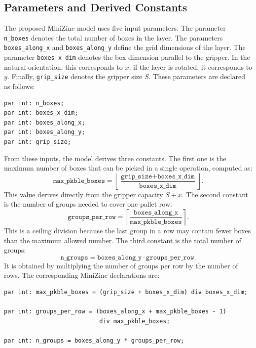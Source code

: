 \subsection{Parameters and Derived Constants}

The proposed MiniZinc model uses five input parameters. The parameter
\texttt{n\_boxes} denotes the total number of boxes in the layer.
The parameters \texttt{boxes\_along\_x} and \texttt{boxes\_along\_y}
define the grid dimensions of the layer. The parameter
\texttt{boxes\_x\_dim} denotes the box dimension parallel to the gripper.
In the natural orientation, this corresponds to \(x\); if the layer is
rotated, it corresponds to \(y\). Finally, \texttt{grip\_size} denotes
the gripper size \(S\). These parameters are declared as follows:
\vspace{0.5cm}
\begin{lstlisting}
par int: n_boxes;
par int: boxes_x_dim;
par int: boxes_along_x;
par int: boxes_along_y;
par int: grip_size;
\end{lstlisting}
\vspace{0.5cm}
From these inputs, the model derives three constants. The first one is the
maximum number of boxes that can be picked in a single operation, computed as:
\[
    \texttt{max\_pkble\_boxes}
    =
    \left\lfloor
    \frac{\texttt{grip\_size} + \texttt{boxes\_x\_dim}}
         {\texttt{boxes\_x\_dim}}
    \right\rfloor .
\]
This value derives directly from the gripper capacity \(S+x\). The second
constant is the number of groups needed to cover one pallet row:
\[
    \texttt{groups\_per\_row}
    =
    \left\lceil
    \frac{\texttt{boxes\_along\_x}}
         {\texttt{max\_pkble\_boxes}}
    \right\rceil .
\]
This is a ceiling division because the last group in a row may contain fewer
boxes than the maximum allowed number. The third constant is the total number of groups:
\[
    \texttt{n\_groups}
    =
    \texttt{boxes\_along\_y}
    \cdot
    \texttt{groups\_per\_row}.
\]
It is obtained by multiplying the number of groups per row by the number of
rows. The corresponding MiniZinc declarations are:
\vspace{0.5cm}
\begin{lstlisting}
par int: max_pkble_boxes = (grip_size + boxes_x_dim) div boxes_x_dim;

par int: groups_per_row = (boxes_along_x + max_pkble_boxes - 1)
                           div max_pkble_boxes;

par int: n_groups = boxes_along_y * groups_per_row;
\end{lstlisting}